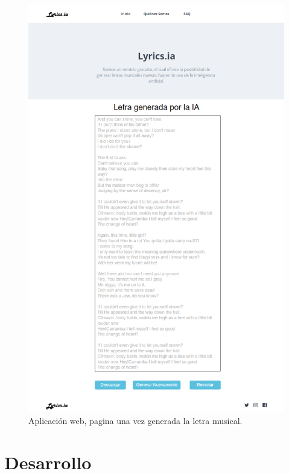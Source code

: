 \documentclass[12pt, a4paper, titlepage]{report}
\begin{document}
\begin{figure}[H] 
	\includegraphics[width=12cm]{./imagenes/Analisis/MockFrontGenerated.png}
	\centering 
	\caption{Aplicación web, pagina una vez generada la letra musical.}
\end{figure} 

\chapter{\textcolor{azulescom}{Desarrollo}}

\end{document}
